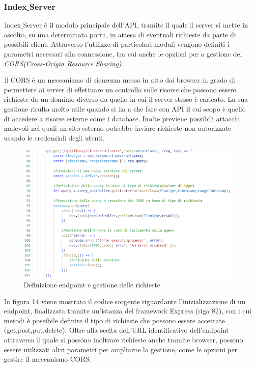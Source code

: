\subsubsection{Index$\_$Server}
Index$\_$Server è il modulo principale dell'API, tramite il quale il server si mette in ascolto, su una determinata porta, in attesa di eventuali richieste da parte di possibili client.
Attraverso l'utilizzo di particolari moduli vengono definiti i parametri necessari alla connessione, tra cui anche le opzioni per a gestione del \emph{CORS(Cross-Origin Resource Sharing)}.

Il CORS \cite{CORS} è un meccanismo di sicurezza messo in atto dai browser in grado di permettere ai server di effettuare un controllo sulle risorse che possono essere richieste da un dominio diverso da quello in cui il server stesso è caricato.
La sua gestione risulta molto utile quando si ha a che fare con API il cui scopo è quello di accedere a risorse esterne come i database.
Inolte previene possibili attacchi malevoli nei quali un sito esterno potrebbe inviare richieste non autorizzate usando le credenziali degli utenti.


\begin{figure}[H]
    \centering \includegraphics[keepaspectratio=true,scale=0.5]{Images/Index_Server_Endpoint.png}
    \caption{Definizione endpoint e gestione delle richieste}
\end{figure}

In figura 14 viene mostrato il codice sorgente riguardante l'inizializzazione di un endpoint, finalizzata tramite un'istanza del framework Express (riga 82), con i cui metodi è possibile definire il tipo di richieste che possono essere accettate (get,post,put,delete). Oltre alla scelta dell'URL identificativo dell'endpoint attraverso il quale si possono inoltrare richieste anche tramite browser, possono essere utilizzati altri parametri per ampliarne la gestione, come le opzioni per gestire il meccanismo CORS.

